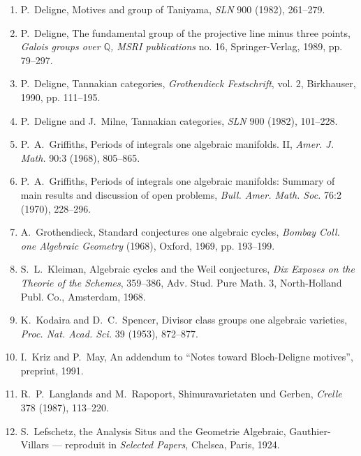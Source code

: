 \documentclass[11pt,a4paper]{article}
\theoremstyle{plain}
\theoremstyle{definition}
\newcommand{\Q}{\mathbb{Q}}
\begin{document}
\begin{enumerate}
\item[{[13]}] P.~Deligne, Motives and group of Taniyama, \textit{SLN} 900 (1982), 261--279.

\item[{[14]}] P.~Deligne, The fundamental group of the projective line minus three points, \textit{Galois groups over $\Q$, MSRI publications} no. 16, Springer-Verlag, 1989, pp. 79--297.

\item[{[15]}] P.~Deligne, Tannakian categories, \textit{Grothendieck Festschrift}, vol. 2, Birkhauser, 1990, pp. 111--195.

\item[{[16]}] P.~Deligne and J.~Milne, Tannakian categories, \textit{SLN} 900 (1982), 101--228.

\item[{[17]}] P.~A.~Griffiths, Periods of integrals one algebraic manifolds. II, \textit{Amer. J. Math.} 90:3 (1968), 805--865.

\item[{[18]}] P.~A.~Griffiths, Periods of integrals one algebraic manifolds: Summary of main results and discussion of open problems, \textit{Bull. Amer. Math. Soc.} 76:2 (1970), 228--296.

\item[{[19]}] A.~Grothendieck, Standard conjectures one algebraic cycles, \textit{Bombay Coll. one Algebraic Geometry} (1968), Oxford, 1969, pp. 193--199.

\item[{[20]}] S.~L.~Kleiman, Algebraic cycles and the Weil conjectures, \textit{Dix Exposes on the Theorie of the Schemes}, 359--386, Adv. Stud. Pure Math. 3, North-Holland Publ. Co., Amsterdam, 1968.

\item[{[21]}] K.~Kodaira and D.~C.~Spencer, Divisor class groups one algebraic varieties, \textit{Proc. Nat. Acad. Sci.} 39 (1953), 872--877.

\item[{[22]}] I.~Kriz and P.~May, An addendum to ``Notes toward Bloch-Deligne motives'', preprint, 1991.

\item[{[23]}] R.~P.~Langlands and M.~Rapoport, Shimuravarietaten und Gerben, \textit{Crelle} 378 (1987), 113--220.

\item[{[24]}] S.~Lefschetz, the Analysis Situs and the Geometrie Algebraic, Gauthier-Villars --- reproduit in \textit{Selected Papers}, Chelsea, Paris, 1924.


\end{enumerate}
\end{document}

